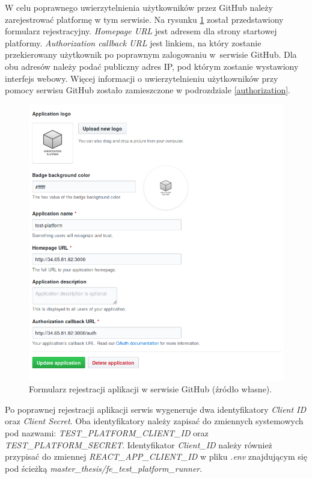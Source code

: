 W celu poprawnego uwierzytelnienia użytkowników przez GitHub należy zarejestrować platformę w tym serwisie.
Na rysunku \ref{fig:github_app_register} został przedstawiony formularz rejestracyjny.
\textit{Homepage URL} jest adresem dla strony startowej platformy.
\textit{Authorization callback URL} jest linkiem, na który zostanie przekierowany użytkownik po poprawnym zalogowaniu w~serwisie GitHub.
Dla obu adresów należy podać publiczny adres IP, pod którym zostanie wystawiony interfejs webowy.
Więcej informacji o uwierzytelnieniu użytkowników przy pomocy serwisu GitHub zostało zamieszczone w podrozdziale \ref{authorization}.

\begin{figure}[h]
    \centering
    \includegraphics[width = 12cm]{chapter05/github_app_register.png}
    \caption{Formularz rejestracji aplikacji w serwisie GitHub (źródło własne).}
    \label{fig:github_app_register}
\end{figure}

Po poprawnej rejestracji aplikacji serwis wygeneruje dwa identyfikatory \textit{Client ID} oraz \textit{Client Secret}.
Oba identyfikatory należy zapisać do zmiennych systemowych pod nazwami: \textit{TEST\_PLATFORM\_CLIENT\_ID} oraz \textit{TEST\_PLATFORM\_SECRET}.
Identyfikator \textit{Client\_ID} należy również przypisać do zmiennej \textit{REACT\_APP\_CLIENT\_ID} w pliku \textit{.env} znajdującym się pod ścieżką \textit{master\_thesis/fe\_test\_platform\_runner}.

